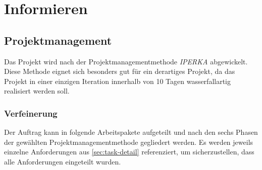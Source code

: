\chapter{Informieren} \label{ch:inform}

\section{Projektmanagement}

Das Projekt wird nach der Projektmanagementmethode \emph{IPERKA} abgewickelt. Diese Methode eignet sich besonders gut
für ein derartiges Projekt, da das Projekt in einer einzigen Iteration innerhalb von 10 Tagen wasserfallartig realisiert werden soll.

\subsection{Verfeinerung}

Der Auftrag kann in folgende Arbeitspakete aufgeteilt und nach den sechs Phasen der gewählten Projektmanagementmethode gegliedert werden.
Es werden jeweils einzelne Anforderungen aus \ref{sec:task-detail} referenziert, um sicherzustellen, dass alle Anforderungen eingeteilt wurden.

